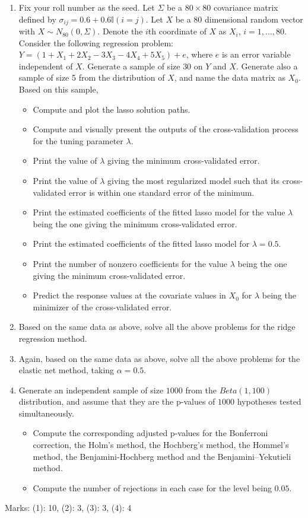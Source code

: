 \documentclass[
]{book}
\begin{document}
\begin{enumerate}
\def\labelenumi{\arabic{enumi}.}
\item
  Fix your roll number as the seed. Let \(\Sigma\) be a \(80 \times 80\) covariance matrix defined by \(\sigma_{i j} = 0.6 + 0.6 \mathbb{I}(i = j)\). Let \(X\) be a \(80\) dimensional random vector with \(X \sim N_{80}( 0, \Sigma )\). Denote the \(i\)th coordinate of \(X\) as \(X_i\), \(i = 1, \ldots, 80\). Consider the following regression problem: \(Y = (1 + X_1 + 2 X_2 - 3 X_3 - 4 X_4 + 5 X_5) + e\), where \(e\) is an error variable independent of \(X\). Generate a sample of size \(30\) on \(Y\) and \(X\). Generate also a sample of size 5 from the distribution of \(X\), and name the data matrix as \(X_0\). Based on this sample,

  \begin{itemize}
  \item
    Compute and plot the lasso solution paths.
  \item
    Compute and visually present the outputs of the cross-validation process for the tuning parameter \(\lambda\).
  \item
    Print the value of \(\lambda\) giving the minimum cross-validated error.
  \item
    Print the value of \(\lambda\) giving the most regularized model such that its cross-validated error is within one standard error of the minimum.
  \item
    Print the estimated coefficients of the fitted lasso model for the value \(\lambda\) being the one giving the minimum cross-validated error.
  \item
    Print the estimated coefficients of the fitted lasso model for \(\lambda = 0.5\).
  \item
    Print the number of nonzero coefficients for the value \(\lambda\) being the one giving the minimum cross-validated error.
  \item
    Predict the response values at the covariate values in \(X_0\) for \(\lambda\) being the minimizer of the cross-validated error.
  \end{itemize}
\item
  Based on the same data as above, solve all the above problems for the ridge regression method.
\item
  Again, based on the same data as above, solve all the above problems for the elastic net method, taking \(\alpha = 0.5\).
\item
  Generate an independent sample of size \(1000\) from the \(Beta(1, 100)\) distribution, and assume that they are the p-values of \(1000\) hypotheses tested simultaneously.

  \begin{itemize}
  \item
    Compute the corresponding adjusted p-values for the Bonferroni correction, the Holm's method, the Hochberg's method, the Hommel's method, the Benjamini-Hochberg method and the Benjamini--Yekutieli method.
  \item
    Compute the number of rejections in each case for the level being \(0.05\).
  \end{itemize}
\end{enumerate}

Marks: (1): 10, (2): 3, (3): 3, (4): 4

  
\end{document}
